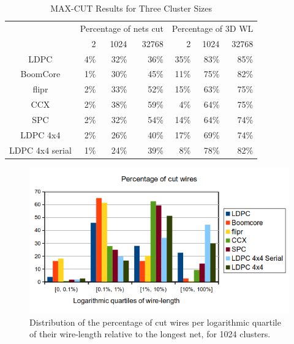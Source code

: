 \documentclass[conference]{IEEEtran}
\begin{document}
\begin{table}[!t]
\renewcommand{\arraystretch}{1.3}
\caption{MAX-CUT Results for Three Cluster Sizes}
\label{tab:res}
\centering
\begin{tabular}{||c||r|r|r||r|r|r||}
\cline{2-7}
\multicolumn{1}{c||}{} & \multicolumn{3}{c||}{Percentage of nets cut} & \multicolumn{3}{c||}{Percentage of 3D WL}\\
\cline{2-7}
\multicolumn{1}{c||}{} & 2 & 1024 & 32768 & 2 & 1024 & 32768\\
\cline{2-7}
\hline
LDPC & 4\% & 32\% & 36\% & 35\% & 83\% & 85\%\\
\hline
BoomCore & 1\% & 30\% & 45\% & 11\% & 75\% & 82\%\\
\hline
flipr & 2\% & 33\% & 52\% & 15\% & 63\% & 75\%\\
\hline
CCX & 2\% & 38\% & 59\% & 4\% & 64\% & 75\%\\
\hline
SPC & 2\% & 32\% & 54\% & 14\% & 64\% & 74\%\\
\hline
LDPC 4x4 & 2\% & 26\% & 40\% & 17\% & 69\% & 74\%\\
\hline
LDPC 4x4 serial & 1\% & 24\% & 39\% & 8\% & 78\% & 82\%\\
\hline
\end{tabular}
\end{table}




\begin{figure}[!t]
\centering
\includegraphics[width=\linewidth]{netCutWL_maxcut_all_log-quartv2.png}
\caption{Distribution of the percentage of cut wires per logarithmic quartile of their wire-length relative to the longest net, for 1024 clusters.}
\label{fig:dits-wl-quart}
\end{figure}
\end{document}
